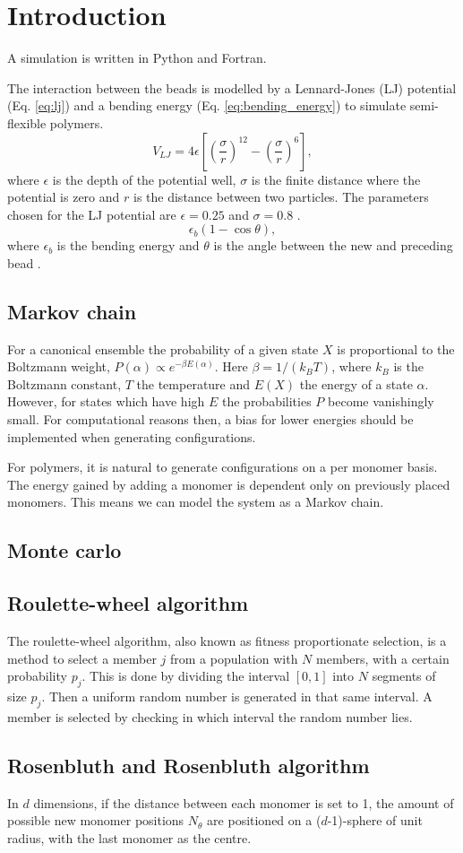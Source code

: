 \section{Introduction}
A simulation is written in Python and Fortran. 

The interaction between the beads is modelled by a Lennard-Jones (LJ) potential (Eq. \ref{eq:lj}) and a bending energy (Eq. \ref{eq:bending_energy}) to simulate semi-flexible polymers.
\begin{equation}\label{eq:lj}
    V_{LJ} = 4\epsilon \left[ \left(\frac{\sigma}{r}\right)^{12} - \left(\frac{\sigma}{r}\right)^{6} \right],
\end{equation} where $\epsilon$ is the depth of the potential well, $\sigma$ is the finite distance where the potential is zero and $r$ is the distance between two particles. The parameters chosen for the LJ potential are $\epsilon=0.25$ and $\sigma=0.8$ \cite{jmt}.
\begin{equation}\label{eq:bending_energy}
    \epsilon_b(1-\cos{\theta}),
\end{equation} where $\epsilon_b$ is the bending energy and $\theta$ is the angle between the new and preceding bead \cite{hsu2011review}.

\subsection{Markov chain}
For a canonical ensemble the probability of a given state $X$ is proportional to the Boltzmann weight, $P(\alpha) \propto e^{-\beta E(\alpha)}$. Here $\beta=1/\left(k_B T\right)$, where $k_B$ is the Boltzmann constant, $T$ the temperature and $E(X)$ the energy of a state $\alpha$. However, for states which have high $E$ the probabilities $P$ become vanishingly small. For computational reasons then, a bias for lower energies should be implemented when generating configurations.

For polymers, it is natural to generate configurations on a per monomer basis. The energy gained by adding a monomer is dependent only on previously placed monomers. This means we can model the system as a Markov chain.

\subsection{Monte carlo}

\subsection{Roulette-wheel algorithm}
The roulette-wheel algorithm, also known as fitness proportionate selection, is a method to select a member $j$ from a population with $N$ members, with a certain probability $p_j$. This is done by dividing the interval $[0,1]$ into $N$ segments of size $p_j$. Then a uniform random number is generated in that same interval. A member is selected by checking in which interval the random number lies.


\subsection{Rosenbluth and Rosenbluth algorithm}
In $d$ dimensions, if the distance between each monomer is set to 1, the amount of possible new monomer positions $N_{\theta}$ are positioned on a ($d$-1)-sphere of unit radius, with the last monomer as the centre.